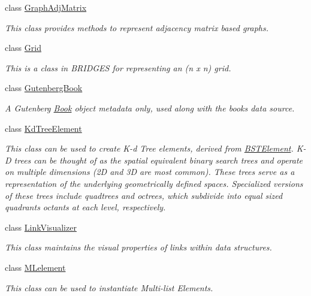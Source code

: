 \begin{DoxyCompactItemize}
class \hyperlink{classbridges_1_1_graph_adj_matrix}{Graph\+Adj\+Matrix}
\begin{DoxyCompactList}\small\item\em This class provides methods to represent adjacency matrix based graphs. \end{DoxyCompactList}\item 
class \hyperlink{classbridges_1_1_grid}{Grid}
\begin{DoxyCompactList}\small\item\em This is a class in B\+R\+I\+D\+G\+E\+S for representing an (n x n) grid. \end{DoxyCompactList}\item 
class \hyperlink{classbridges_1_1_gutenberg_book}{Gutenberg\+Book}
\begin{DoxyCompactList}\small\item\em A Gutenberg \hyperlink{classbridges_1_1_book}{Book} object metadata only, used along with the books data source. \end{DoxyCompactList}\item 
class \hyperlink{classbridges_1_1_kd_tree_element}{Kd\+Tree\+Element}
\begin{DoxyCompactList}\small\item\em This class can be used to create K-\/d Tree elements, derived from \hyperlink{classbridges_1_1_b_s_t_element}{B\+S\+T\+Element}. K-\/\+D trees can be thought of as the spatial equivalent binary search trees and operate on multiple dimensions (2\+D and 3\+D are most common). These trees serve as a representation of the underlying geometrically defined spaces. Specialized versions of these trees include quadtrees and octrees, which subdivide into equal sized quadrants octants at each level, respectively. \end{DoxyCompactList}\item 
class \hyperlink{classbridges_1_1_link_visualizer}{Link\+Visualizer}
\begin{DoxyCompactList}\small\item\em This class maintains the visual properties of links within data structures. \end{DoxyCompactList}\item 
class \hyperlink{classbridges_1_1_m_lelement}{M\+Lelement}
\begin{DoxyCompactList}\small\item\em This class can be used to instantiate Multi-\/list Elements. \end{DoxyCompactList}\item 

\end{DoxyCompactItemize}
